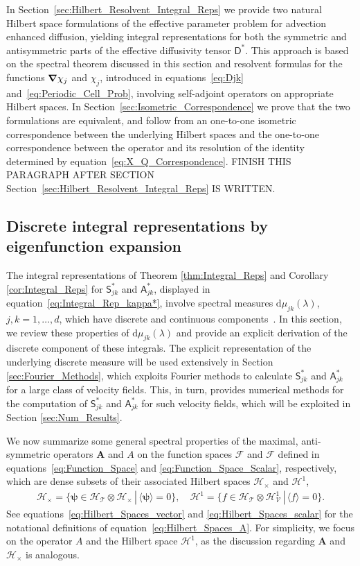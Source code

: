 \documentclass[leqno,onefignum,onetabnum]{siamltex1213}
\newcommand{\secref}[1]{Section~\ref{#1}}
\renewcommand{\d}{\mathrm{d}}
\newcommand{\Ab}{\mathbf{A}}
\newcommand{\Tc}{\mathcal{T}}
\newcommand{\Vc}{\mathcal{V}}
\newcommand{\Hc}{\mathcal{H}}
\newcommand{\Fc}{\mathcal{F}}
\newcommand{\Dm}{\mathsf{D}}
\newcommand{\Sm}{\mathsf{S}}
\newcommand{\Am}{\mathsf{A}}
\newcommand{\Hs}{\mathscr{H}}
\newcommand{\Fs}{\mathscr{F}}
\newcommand\bnabla{\mbox{\boldmath${\nabla}$}}
\newcommand{\vecpsi}{\boldsymbol{\psi}}
\begin{document}
In \secref{sec:Hilbert_Resolvent_Integral_Reps} we provide two natural Hilbert space
formulations of the effective parameter problem for advection enhanced
diffusion, yielding integral representations for both the symmetric and
antisymmetric parts of the effective diffusivity tensor $\Dm^*$. This
approach is based on the spectral theorem discussed in this section
and resolvent formulas for the functions $\bnabla\chi_j$ and $\chi_j$,
introduced in equations~\eqref{eq:Djk}
and~\eqref{eq:Periodic_Cell_Prob}, involving self-adjoint operators on
appropriate Hilbert spaces. In \secref{sec:Isometric_Correspondence}
we prove that the two formulations are equivalent, and follow from an
one-to-one isometric correspondence between the underlying Hilbert
spaces and the one-to-one correspondence between the operator and its
resolution of the identity determined by
equation~\eqref{eq:X_Q_Correspondence}.
FINISH THIS PARAGRAPH AFTER SECTION
\secref{sec:Hilbert_Resolvent_Integral_Reps} IS WRITTEN. 





\subsection{Discrete integral representations by eigenfunction
  expansion}\label{sec:Eig_Funct_Exp} 
%
The integral representations of Theorem \ref{thm:Integral_Reps} and
Corollary \ref{cor:Integral_Reps} for $\Sm^*_{jk}$ and $\Am^*_{jk}$,
displayed in equation~\eqref{eq:Integral_Rep_kappa*},  involve
spectral measures $\d\mu_{jk}(\lambda)$, $j,k=1,\ldots,d$, which have discrete and
continuous components~\cite{Reed-1980,Stone:64}. In this section, we
review these properties of $\d\mu_{jk}(\lambda)$ and provide an explicit
derivation of the discrete component of these integrals. The 
explicit representation of the underlying discrete measure will
be used extensively in Section \ref{sec:Fourier_Methods}, which
exploits Fourier methods to calculate $\Sm^*_{jk}$ and $\Am^*_{jk}$ for a
large class of velocity fields. This, in turn, provides numerical
methods for the computation of $\Sm^*_{jk}$ and $\Am^*_{jk}$ for such
velocity fields, which will be exploited in Section
\ref{sec:Num_Results}.   



We now summarize some general spectral properties of the maximal,
anti-symmetric operators $\Ab$ and $A$ on the function spaces $\Fc$
and $\Fs$ defined in equations~\eqref{eq:Function_Space} and
\eqref{eq:Function_Space_Scalar}, respectively, which are dense
subsets of their associated Hilbert spaces $\Hc_\times$ and $\Hs^1$,  
%
\begin{align}\label{eq:Hilbert_Spaces_A}
  \Hc_\times=\{\vecpsi\in \Hc_\Tc\otimes\Hc_\times \,|\, \langle\vecpsi\rangle=0\},\quad
  \Hs^1=\{f\in \Hs_\Tc\otimes\Hs^1_\Vc \,|\, \langle f\rangle=0\}.
\end{align}
%
See equations~\eqref{eq:Hilbert_Spaces_vector} and
\eqref{eq:Hilbert_Spaces_scalar} for the notational definitions of
equation~\eqref{eq:Hilbert_Spaces_A}. For simplicity, we focus on the 
operator $A$ and the Hilbert space $\Hs^1$, as the discussion regarding
$\Ab$ and $\Hc_\times$ is analogous.
\end{document}
